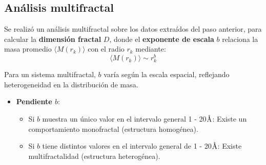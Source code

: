 	

	
	
	\subsection{An\'{a}lisis multifractal}
	
	Se realiz\'{o} un an\'{a}lisis multifractal sobre los datos extra\'{i}dos del paso anterior, para calcular la \textbf{dimensi\'{o}n fractal} $D$, donde el \textbf{exponente de escala} $b$  relaciona la masa  promedio $\langle M(r_{k}) \rangle$ con el radio $r_{k}$ mediante:
	\begin{equation}
		\langle M(r_{k}) \rangle \sim r_{k}^b
	\end{equation}
	
	Para un sistema multifractal, $b$ var\'{i}a seg\'{u}n la escala espacial, reflejando heterogeneidad en la distribuci\'{o}n de masa.
	\begin{itemize}
		\item \textbf{Pendiente $b$}:
		\begin{itemize}
			\item Si $b$ muestra un \'{u}nico valor en el intervalo general 1 - 20$\textup{\r{A}}$: Existe un comportamiento monofractal (estructura homog\'{e}nea).
			\item Si $b$  tiene distintos valores en el intervalo general de 1 - 20$\textup{\r{A}}$: Existe multifractalidad (estructura heterog\'{e}nea).
		\end{itemize}
	\end{itemize}
	
